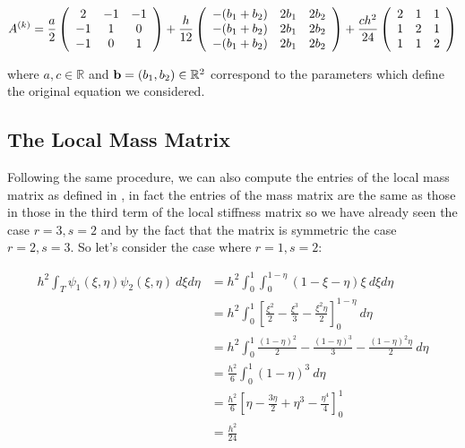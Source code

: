\begin{equation}\label{eq:twod-local-stiffness}
 A^{(k)} =
    \frac{a}{2}\left(\begin{array}{c c c}
         2 & -1 & -1 \\
        -1 &  1 &  0 \\
        -1 &  0 &  1
    \end{array}\right)
    + \frac{h}{12} \left(\begin{array}{c c c}
        -(b_1 + b_2) & 2b_1 & 2b_2 \\
        -(b_1 + b_2) & 2b_1  & 2b_2 \\
        -(b_1 + b_2) & 2b_1  & 2b_2
    \end{array}\right)
    + \frac{ch^2}{24}\left(\begin{array}{c c c}
         2 &  1 &  1 \\
         1 &  2 &  1 \\
         1 &  1 &  2
      \end{array}\right)
\end{equation}

where $a, c \in \mathbb{R}$ and $\mathbf{b} = (b_1, b_2) \in \mathbb{R}^2$
correspond to the parameters which define the original equation
 we considered.

\subsection{The Local Mass Matrix}\label{sec:twod-deterministic-local-mass}

Following the same procedure, we can also compute the entries of the local mass
matrix as defined in , in fact the
entries of the mass matrix are the same as those in those in the third term of
the local stiffness matrix so we have already seen the case $r = 3, s = 2$ and
by the fact that the matrix is symmetric the case $r = 2, s = 3$. So let's
consider the case where $r = 1, s = 2$:

\begin{align*}
    h^2\int_T\psi_1(\xi,\eta)\psi_2(\xi,\eta)\ d\xi d\eta
    &=  h^2\int_0^1\int_0^{1-\eta}(1 - \xi -\eta)\xi\ d\xi d\eta \\
    &= h^2\int_0^1\left[\frac{\xi^2}{2} -\frac{\xi^3}{3}
                        -\frac{\xi^2\eta}{2}\right]_0^{1-\eta}\  d\eta \\
    &= h^2\int_0^1\frac{(1-\eta)^2}{2} - \frac{(1-\eta)^3}{3}- \frac{(1-\eta)^2\eta}{2}\ d\eta \\
    &= \frac{h^2}{6}\int_0^1(1- \eta)^3\ d\eta \\
    &= \frac{h^2}{6}\left[\eta -\frac{3\eta}{2} + \eta^3 - \frac{\eta^4}{4}\right]_0^1 \\
    &= \frac{h^2}{24}
\end{align*}

